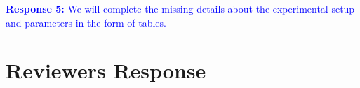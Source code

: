 \documentclass[12pt,one-column]{article}
\begin{document}
\noindent\textcolor{blue}{\textbf{Response 5:}
We will complete the missing details about the experimental setup and parameters in the form of tables.
}
	
\section{Reviewers Response}
\end{document}
